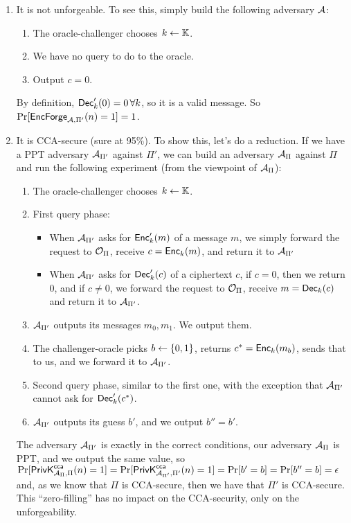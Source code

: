 \begin{solution}
	\begin{enumerate}
		\item It is not unforgeable. To see this, simply build the following adversary $\A$:
		\begin{enumerate}[label=(\arabic*)]
			\item The oracle-challenger chooses $k \pick \K$.
			\item We have no query to do to the oracle.
			\item Output $c=0$.
		\end{enumerate}
		By definition, $\Dec'_k(0)=0 \, \forall k$, so it is a valid message. So $\Pr[\EncForge_{\A, \Pi'}(n)=1]=1$.
		\item It is CCA-secure (sure at 95\%). To show this, let's do a reduction. If we have a PPT adversary $\A_{\Pi'}$ against $\Pi'$, we can build an adversary $\A_\Pi$ against $\Pi$ and run the following experiment (from the viewpoint of $\A_\Pi$):
		\begin{enumerate}[label=(\arabic*)]
			\item The oracle-challenger chooses $k \pick \K$.

			\item First query phase:
			\begin{itemize}
				\item When $\A_{\Pi'}$ asks for $\Enc'_k(m)$ of a message $m$, we simply forward the request to $\O_\Pi$, receive $c=\Enc_k(m)$, and return it to $\A_{\Pi'}$
				\item When $\A_{\Pi'}$ asks for $\Dec'_k(c)$ of a ciphertext $c$, if $c=0$, then we return $0$, and if $c\neq 0$, we forward the request to $\O_\Pi$, receive $m=\Dec_k(c)$ and return it to $\A_{\Pi'}$.
			\end{itemize}

			\item $\A_{\Pi'}$ outputs its messages $m_0, m_1$. We output them.

			\item The challenger-oracle picks $b\pick \bset$, returns $c^*=\Enc_k(m_b)$, sends that to us, and we forward it to $\A_{\Pi'}$.

			\item Second query phase, similar to the first one, with the exception that $\A_{\Pi'}$ cannot ask for $\Dec'_k(c^*)$.

			\item $\A_{\Pi'}$ outputs its guess $b'$, and we output $b''=b'$.
		\end{enumerate}
		The adversary $\A_{\Pi'}$ is exactly in the correct conditions, our adversary $\A_\Pi$ is PPT, and we output the same value, so $\Pr[\PrivKcca[\A_\Pi, \Pi](n)=1]=\Pr[\PrivKcca[\A_{\Pi'}, \Pi'](n)=1]=\Pr[b'=b]=\Pr[b''=b]=\negl$
		and, as we know that $\Pi$ is CCA-secure, then we have that $\Pi'$ is CCA-secure. This ``zero-filling'' has no impact on the CCA-security, only on the unforgeability.
	\end{enumerate}
\end{solution}



